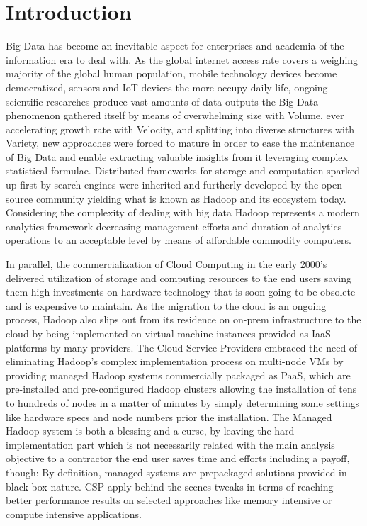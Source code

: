 \documentclass[review]{elsarticle}
\begin{document}
\linenumbers

\section{Introduction}

Big Data has become an inevitable aspect for enterprises and academia of the information era to deal with. As the global internet access rate covers a weighing majority of the global human population, mobile technology devices become democratized, sensors and IoT devices the more occupy daily life, ongoing scientific researches produce vast amounts of data outputs the Big Data phenomenon gathered itself by means of overwhelming size with Volume, ever accelerating growth rate with Velocity, and splitting into diverse structures with Variety, new approaches were forced to mature in order to ease the maintenance of Big Data and enable extracting valuable insights from it leveraging complex statistical formulae. Distributed frameworks for storage and computation sparked up first by search engines were inherited and furtherly developed by the open source community yielding what is known as Hadoop and its ecosystem today. Considering the complexity of dealing with big data Hadoop represents a modern analytics framework decreasing management efforts and duration of analytics operations to an acceptable level by means of affordable commodity computers.

In parallel, the commercialization of Cloud Computing in the early 2000's delivered utilization of storage and computing resources to the end users saving them high investments on hardware technology that is soon going to be obsolete and is expensive to maintain. As the migration to the cloud is an ongoing process, Hadoop also slips out from its residence on on-prem infrastructure to the cloud by being implemented on virtual machine instances provided as IaaS platforms by many providers. The Cloud Service Providers embraced the need of eliminating Hadoop's complex implementation process on multi-node VMs by providing managed Hadoop systems commercially packaged as PaaS, which are pre-installed and pre-configured Hadoop clusters allowing the installation of tens to hundreds of nodes in a matter of minutes by simply determining some settings like hardware specs and node numbers prior the installation. The Managed Hadoop system is both a blessing and a curse, by leaving the hard implementation part which is not necessarily related with the main analysis objective to a contractor the end user saves time and efforts including a payoff, though: By definition, managed systems are prepackaged solutions provided in black-box nature. CSP apply behind-the-scenes tweaks in terms of reaching better performance results on selected approaches like memory intensive or compute intensive applications.
\end{document}
